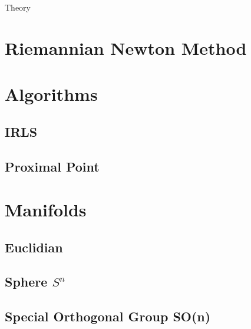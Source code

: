 \begin{chapter}{Theory}
\label{ch:theory}

\section{Riemannian Newton Method} %
\label{sec:Riemannian Newton Method}


\section{Algorithms} %
\label{sec:Algorithms}

\subsection{IRLS} %
\label{sub:IRLS}


\subsection{Proximal Point} %
\label{sub:Proximal Point}



\section{Manifolds} %
\label{sec:Manifolds}

\subsection{Euclidian} %
\label{sub:Euclidian}


\subsection{Sphere $S^n$} %
\label{sub:Sphere}


\subsection{Special Orthogonal Group SO(n)} %
\label{sub:SO(N)}


\end{chapter}
